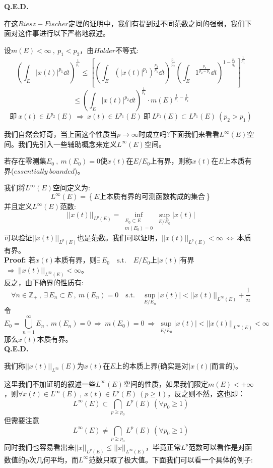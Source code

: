 \textbf{Q.E.D.}

在这$Riesz-Fischer$定理的证明中，我们有提到过不同范数之间的强弱，我们下面对这件事进行以下严格地叙述。

设$m(E)<\infty \ , \ p_1<p_2$，由$H\ddot{o}lder$不等式:
\[\left(\int_E|x(t)|^{p_1}\dd t\right)^{\frac{1}{p_1}} \leq \left[\left(\int_E\left(|x(t)|^{p_1}\right)^{\frac{p_2}{p_1}}\dd t\right)^{\frac{p_1}{p_2}}\left(\int_E1^{\frac{p_2}{p_2-p_1}}\dd t\right)^{1-\frac{p_1}{q_2}}\right]^{\frac{1}{p_1}}\]
\[\leq \left(\int_E|x(t)|^{p_2}\dd t\right)^{\frac{1}{p_2}} \cdot m(E)^{\frac{1}{p_1}-\frac{1}{p_2}}\]
\[\text{即} \ x(t) \in L^{p_2}(E) \ \Rightarrow \ x(t) \in L^{p_1}(E) \ \text{即} \ L^{p_2}(E) \subset L^{p_1}(E) \ (p_2>p_1)\]

我们自然会好奇，当上面这个性质当$p \to \infty$时成立吗?下面我们来看看$L^{\infty}(E)$空间。我们先引入一些辅助概念来定义$L^{\infty}(E)$空间。
\begin{definition}[本质有界]
    若存在零测集$E_0 \ , \ m(E_0)=0$使$x(t)$在$E/E_0$上有界，则称$x(t)$在$E$上本质有界($essentially \ bounded$)。
\end{definition}
我们将$L^{\infty}(E)$空间定义为:
\[L^{\infty}(E)=\left\{E\text{上本质有界的可测函数构成的集合}\right\}\]
并且定义$L^{\infty}(E)$范数:
\[||x(t)||_{L^p(E)}=\mathop \text{inf}\limits_{\substack{E_0 \subset E \\ m(E_0)=0}}\mathop \text{sup}\limits_{E/E_0}|x(t)|\]
可以验证$||x(t)||_{L^p(E)}$也是范数。我们可以证明，$||x(t)||_{L^p(E)}<\infty \ \Leftrightarrow \ $本质有界。\\
\textbf{Proof:} 若$x(t)$本质有界，则$\exists \, E_0 \quad \text{s.t.} \quad E/E_0$上$|x(t)|$有界$ \ \Rightarrow \ ||x(t)||_{L^{\infty}(E)}<\infty$。\\
反之，由下确界的性质有:
\[\forall n \in \mathbb{Z}_+ \ , \ \exists \,E_n \subset E \ , \ m(E_n)=0 \quad \text{s.t.} \quad \mathop \text{sup}\limits_{E/E_n}|x(t)|<||x(t)||_{L^{\infty}(E)}+\frac{1}{n}\]
令
\[E_0=\bigcup_{n=1}^{\infty}E_n \ , \ m(E_n)=0 \ \Rightarrow \ m(E_0)=0 \ \Rightarrow \ \mathop \text{sup}\limits_{E/E_0}|x(t)|<||x(t)||_{L^{\infty}(E)}<\infty\]
那么$x(t)$本质有界。\\
\textbf{Q.E.D.}
\begin{definition}[本质上界] \label{infty}
    我们称$||x(t)||_{L^{\infty}} (E)$为$x(t)$在$E$上的本质上界(确实是对$|x(t)|$而言的)。
\end{definition}
这里我们不加证明的叙述一些$L^{\infty}(E)$空间的性质，如果我们限定$m(E)<+\infty$，则$\forall x(t) \in L^{\infty}(E) \ , \ x(t) \in L^p(E) \ (p \geq 1)$，反之则不然，这也即：
\[L^{\infty}(E) \subset \bigcap_{p \geq p_0}L^{p}(E) \ (\forall p_0 \geq 1)\]
但需要注意
\[L^{\infty}(E) \neq \bigcap_{p \geq p_0}L^{p}(E) \ (\forall p_0 \geq 1)\]
同时我们也容易看出来$||x||_{L^p(E)} \leq ||x||_{L^{\infty}(E)}$，毕竟正常$L^p$范数可以看作是对函数值的p次几何平均，而$L^{\infty}$范数只取了极大值。下面我们可以看一个具体的例子:

